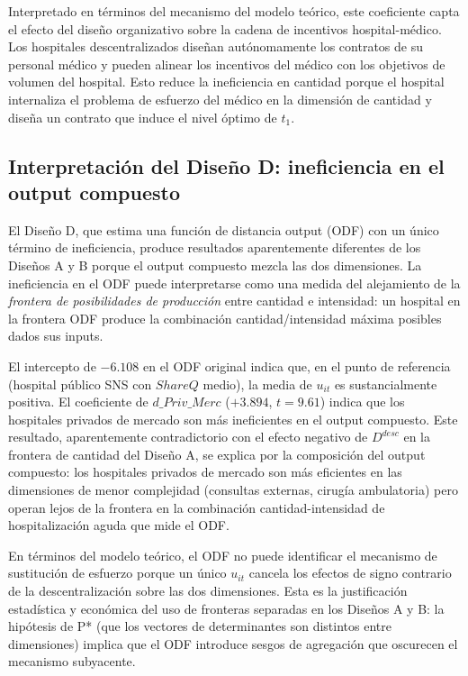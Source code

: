 \documentclass[12pt, a4paper, twoside, openright]{book}
\theoremstyle{plain}
\theoremstyle{definition}
\theoremstyle{remark}
\begin{document}
Interpretado en términos del mecanismo del modelo teórico, este coeficiente capta el efecto del diseño organizativo sobre la cadena de incentivos hospital-médico. Los hospitales descentralizados diseñan autónomamente los contratos de su personal médico y pueden alinear los incentivos del médico con los objetivos de volumen del hospital. Esto reduce la ineficiencia en cantidad porque el hospital internaliza el problema de esfuerzo del médico en la dimensión de cantidad y diseña un contrato que induce el nivel óptimo de $t_1$.

\subsection{Interpretación del Diseño D: ineficiencia en el output compuesto}

El Diseño D, que estima una función de distancia output (ODF) con un único término de ineficiencia, produce resultados aparentemente diferentes de los Diseños A y B porque el output compuesto mezcla las dos dimensiones. La ineficiencia en el ODF puede interpretarse como una medida del alejamiento de la \textit{frontera de posibilidades de producción} entre cantidad e intensidad: un hospital en la frontera ODF produce la combinación cantidad/intensidad máxima posibles dados sus inputs.

El intercepto de $-6.108$ en el ODF original indica que, en el punto de referencia (hospital público SNS con $ShareQ$ medio), la media de $u_{it}$ es sustancialmente positiva. El coeficiente de $d\_Priv\_Merc$ ($+3.894$, $t=9.61$) indica que los hospitales privados de mercado son más ineficientes en el output compuesto. Este resultado, aparentemente contradictorio con el efecto negativo de $D^{desc}$ en la frontera de cantidad del Diseño A, se explica por la composición del output compuesto: los hospitales privados de mercado son más eficientes en las dimensiones de menor complejidad (consultas externas, cirugía ambulatoria) pero operan lejos de la frontera en la combinación cantidad-intensidad de hospitalización aguda que mide el ODF.

En términos del modelo teórico, el ODF no puede identificar el mecanismo de sustitución de esfuerzo porque un único $u_{it}$ cancela los efectos de signo contrario de la descentralización sobre las dos dimensiones. Esta es la justificación estadística y económica del uso de fronteras separadas en los Diseños A y B: la hipótesis de P* (que los vectores de determinantes son distintos entre dimensiones) implica que el ODF introduce sesgos de agregación que oscurecen el mecanismo subyacente.
\end{document}
